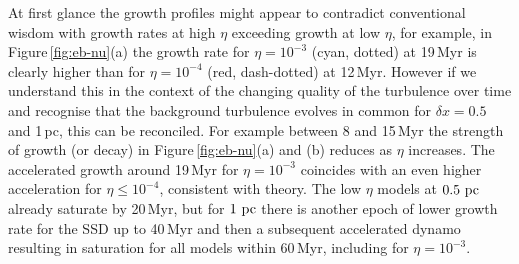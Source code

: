 \documentclass[preprint2]{aastex63}
\newcommand\pc{~ {\rm pc}}
\newcommand\dx{ {\delta x}}
\begin{document}
At first glance the growth profiles might appear to contradict conventional
wisdom with growth rates at high $\eta$ exceeding growth at low $\eta$, for
example, in Figure\,\ref{fig:eb-nu}(a) the growth rate for $\eta=10^{-3}$ (cyan,
dotted) at 19\,Myr is clearly higher than for $\eta=10^{-4}$ (red, dash-dotted)
at 12\,Myr.
However if we understand this in the context of the changing quality of the 
turbulence over time and recognise that the background turbulence evolves in
common for $\dx=0.5$ and 1\,pc, this can be reconciled.
For example between 8 and 15\,Myr the strength of growth (or decay) in
Figure\,\ref{fig:eb-nu}(a) and (b) reduces as $\eta$ increases.
The accelerated growth around 19\,Myr for $\eta=10^{-3}$ coincides with an
even higher acceleration for $\eta\le10^{-4}$, consistent with theory.
The low $\eta$ models at $0.5\pc$ already saturate by 20\,Myr, but for $1\pc$ there
is another epoch of lower growth rate for the SSD up to
40\,Myr and then a subsequent accelerated dynamo resulting in saturation for
all models within 60\,Myr, including for $\eta=10^{-3}$.
\end{document}

